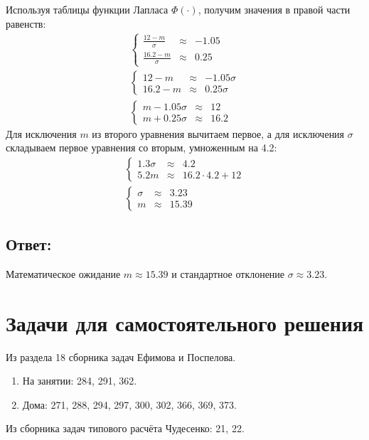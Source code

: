 Используя таблицы функции Лапласа $\Phi(\cdot)$, получим значения в правой части равенств:
\begin{gather}
    \left \{
    \begin{array}{lcl}
        \frac{12-m}{\sigma}   & \approx & -1.05 \\
        \frac{16.2-m}{\sigma} & \approx & 0.25
    \end{array}
    \right . \\
%
    \left \{
    \begin{array}{lcl}
        12 - m   & \approx & -1.05 \sigma \\
        16.2 - m & \approx & 0.25 \sigma
    \end{array}
    \right . \\
%
    \left \{
    \begin{array}{lcl}
        m - 1.05 \sigma & \approx & 12   \\
        m + 0.25 \sigma & \approx & 16.2
    \end{array}
    \right .
\end{gather}
Для исключения $m$ из второго уравнения вычитаем первое, а для исключения $\sigma$ складываем первое уравнения со вторым, умноженным на 4.2:
\begin{gather}
    \left \{
    \begin{array}{lcl}
        1.3 \sigma & \approx & 4.2                 \\
        5.2 m      & \approx & 16.2 \cdot 4.2 + 12
    \end{array}
    \right . \\
%
    \left \{
    \begin{array}{lcl}
        \sigma & \approx & 3.23  \\
        m      & \approx & 15.39
    \end{array}
    \right .
\end{gather}

\subsection*{Ответ:}
Математическое ожидание $m \approx 15.39$ и стандартное отклонение $\sigma \approx 3.23$.

\section*{Задачи для самостоятельного решения}

Из раздела 18 сборника задач Ефимова и Поспелова.
\begin{enumerate}
    \item На занятии: 284, 291, 362.
    \item Дома: 271, 288, 294, 297, 300, 302, 366, 369, 373.
\end{enumerate}

Из сборника задач типового расчёта Чудесенко: 21, 22.